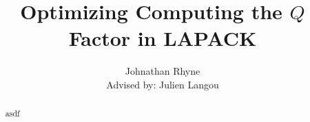 \documentclass[12pt]{article}
\title{Optimizing Computing the $Q$ Factor in LAPACK}
\author{Johnathan Rhyne\\ Advised by: Julien Langou}
\begin{document}
    \maketitle
    \begin{abstract}
    asdf
    \end{abstract}
\end{document}
